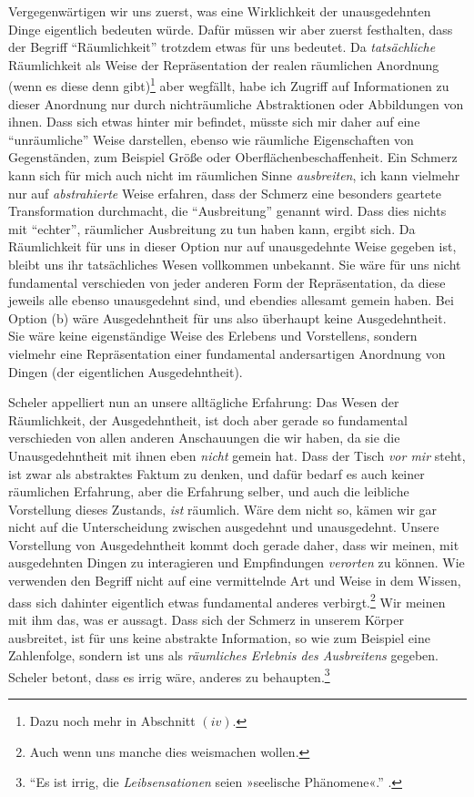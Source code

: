 \documentclass[a4paper, 12pt]{article}
\begin{document}
\begin{onehalfspace}

Vergegenwärtigen wir uns zuerst, was eine Wirklichkeit der unausgedehnten Dinge eigentlich bedeuten würde. Dafür müssen wir aber zuerst festhalten, dass der Begriff "`Räumlichkeit"' trotzdem etwas für uns bedeutet. Da \emph{tatsächliche} Räumlichkeit als Weise der Repräsentation der realen räumlichen Anordnung (wenn es diese denn gibt)\footnote{Dazu noch mehr in Abschnitt $(iv)$.} aber wegfällt, habe ich Zugriff auf Informationen zu dieser Anordnung nur durch nichträumliche Abstraktionen oder Abbildungen von ihnen. Dass sich etwas hinter mir befindet, müsste sich mir daher auf eine "`unräumliche"' Weise darstellen, ebenso wie räumliche Eigenschaften von Gegenständen, zum Beispiel Größe oder Oberflächen\-be\-schaf\-fenheit. Ein Schmerz kann sich für mich auch nicht im räumlichen Sinne \emph{ausbreiten}, ich kann vielmehr nur auf \emph{abstrahierte} Weise erfahren, dass der Schmerz eine besonders geartete Transformation durchmacht, die "`Ausbreitung"' genannt wird. Dass dies nichts mit "`echter"', räumlicher Ausbreitung zu tun haben kann, ergibt sich. Da Räumlichkeit für uns in dieser Option nur auf unausgedehnte Weise gegeben ist, bleibt uns ihr tatsächliches Wesen vollkommen unbekannt. Sie wäre für uns nicht fundamental verschieden von jeder anderen Form der Repräsentation, da diese jeweils alle ebenso unausgedehnt sind, und ebendies allesamt gemein haben. Bei Option (b) wäre Ausgedehntheit für uns also überhaupt keine Ausgedehntheit. Sie wäre keine eigenständige Weise des Erlebens und Vorstellens, sondern vielmehr eine Repräsentation einer fundamental andersartigen Anordnung von Dingen (der eigentlichen Ausgedehntheit).

Scheler appelliert nun an unsere alltägliche Erfahrung: Das Wesen der Räumlichkeit, der Ausgedehntheit, ist doch aber gerade so fundamental verschieden von allen anderen Anschauungen die wir haben, da sie die Unausgedehntheit mit ihnen eben \emph{nicht} gemein hat. Dass der Tisch \emph{vor mir} steht, ist zwar als abstraktes Faktum zu denken, und dafür bedarf es auch keiner räumlichen Erfahrung, aber die Erfahrung selber, und auch die leibliche Vorstellung dieses Zustands, \emph{ist} räumlich. Wäre dem nicht so, kämen wir gar nicht auf die Unterscheidung zwischen ausgedehnt und unausgedehnt. Unsere Vorstellung von Ausgedehntheit kommt doch gerade daher, dass wir meinen, mit ausgedehnten Dingen zu interagieren und Empfindungen \emph{verorten} zu können. Wie verwenden den Begriff nicht auf eine vermittelnde Art und Weise in dem Wissen, dass sich dahinter eigentlich etwas fundamental anderes verbirgt.\footnote{Auch wenn uns manche dies weismachen wollen.} Wir meinen mit ihm das, was er aussagt. Dass sich der Schmerz in unserem Körper ausbreitet, ist für uns keine abstrakte Information, so wie zum Beispiel eine Zahlenfolge, sondern ist uns als \emph{räumliches Erlebnis des Ausbreitens} gegeben. Scheler betont, dass es irrig wäre, anderes zu behaupten.\footnote{"`Es ist irrig, die \emph{Leibsensationen} seien »seelische Phänomene«."' .} 


\end{onehalfspace}
\end{document}
